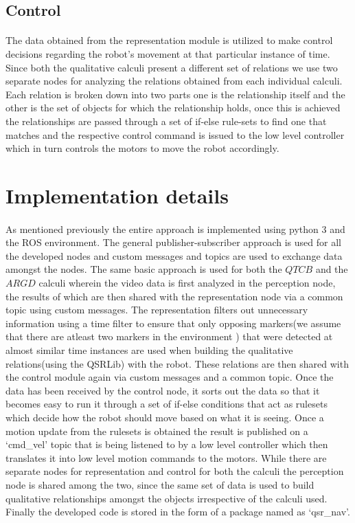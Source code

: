 \subsection{Control}
\paragraph{} The data obtained from the representation module is utilized to make control decisions regarding the robot's movement at that particular instance of time. Since both the qualitative calculi present a different set of relations we use two separate nodes for analyzing the relations obtained from each individual calculi. Each relation is broken down into two parts one is the relationship itself and the other is the set of objects for which the relationship holds, once this is achieved the relationships are passed through a set of if-else rule-sets to find one that matches and the respective control command is issued to the low level controller which in turn controls the motors to move the robot accordingly. 

\section{Implementation details}
\paragraph{} As mentioned previously the entire approach is implemented using python 3 and the ROS environment. The general publisher-subscriber approach is used for all the developed nodes and custom messages and topics are used to exchange data amongst the nodes. The same basic approach is used for both the $QTCB$ and the $ARGD$ calculi wherein the video data is first analyzed in the perception node, the results of which are then shared with the representation node via a common topic using custom messages. The representation filters out unnecessary information using a time filter to ensure that only opposing markers(we assume that there are atleast two markers in the environment ) that were detected at almost similar time instances are used when building the qualitative relations(using the QSRLib) with the robot. These relations are then shared with the control module again via custom messages and a common topic. Once the data has been received by the control node, it sorts out the data so that it becomes easy to run it through a set of if-else conditions that act as rulesets which decide how the robot should move based on what it is seeing. Once a motion update from the rulesets is obtained the result is published on a `cmd\_vel' topic that is being listened to by a low level controller which then translates it into low level motion commands to the motors. While there are separate nodes for representation and control for both the calculi the perception node is shared among the two, since the same set of data is used to build qualitative relationships amongst the objects irrespective of the calculi used. Finally the developed code is stored in the form of a package named as `qsr\_nav'.

